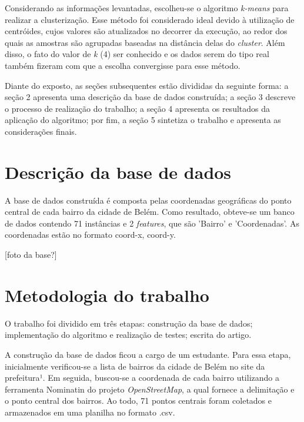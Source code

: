 \documentclass[12pt]{article}
\begin{document}
Considerando as informações levantadas, escolheu-se o algoritmo \textit{k-means} para realizar a clusterização. Esse método foi considerado ideal devido à utilização de centróides, cujos valores são atualizados no decorrer da execução, ao redor dos quais as amostras são agrupadas baseadas na distância delas do \textit{cluster}. Além disso, o fato do valor de \textit {k} (4) ser conhecido e os dados serem do tipo real também fizeram com que a escolha convergisse para esse método.

Diante do exposto, as seções subsequentes estão divididas da seguinte forma: a seção 2 apresenta uma descrição da base de dados construída; a seção 3 descreve o processo de realização do trabalho; a seção 4 apresenta os resultados da aplicação do algoritmo; por fim, a seção 5 sintetiza o trabalho e apresenta as considerações finais.





\section{Descrição da base de dados}
A base de dados construída é composta pelas coordenadas geográficas do ponto central de cada bairro da cidade de Belém. Como resultado, obteve-se um banco de dados contendo 71 instâncias e 2 \textit{features}, que são 'Bairro' e 'Coordenadas'. As coordenadas estão no formato coord-x, coord-y.



[foto da base?]

\section{Metodologia do trabalho}
O trabalho foi dividido em três etapas: construção da base de dados; implementação do algoritmo e realização de testes; escrita do artigo.

A construção da base de dados ficou a cargo de um estudante. Para essa etapa, inicialmente verificou-se a lista de bairros da cidade de Belém no site da prefeitura¹. Em seguida, buscou-se a coordenada de cada bairro utilizando a ferramenta Nominatin do projeto \textit{OpenStreetMap}, a qual fornece a delimitação e o ponto central dos bairros. Ao todo, 71 pontos centrais foram coletados e armazenados em uma planilha no formato .csv.
\end{document}
